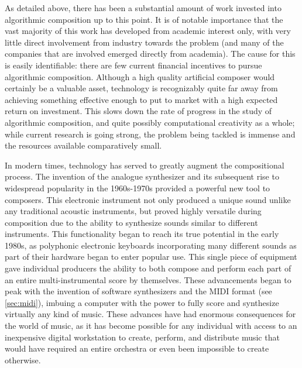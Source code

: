 \documentclass[ author={Stephen Livermore-Tozer},
				supervisor={Dr. Peter Flach},
				degree={MEng},
				title={Algorithmic Co-composition Using Machine Learning},
				subtitle={},
				type={research},
				year={2016} ]{dissertation}
\begin{document}
	As detailed above, there has been a substantial amount of work invested into algorithmic composition up to this point. It is of notable importance that the vast majority of this work has developed from academic interest only, with very little direct involvement from industry towards the problem (and many of the companies that are involved emerged directly from academia). The cause for this is easily identifiable: there are few current financial incentives to pursue algorithmic composition. Although a high quality artificial composer would certainly be a valuable asset, technology is recognizably quite far away from achieving something effective enough to put to market with a high expected return on investment. This slows down the rate of progress in the study of algorithmic composition, and quite possibly computational creativity as a whole; while current research is going strong, the problem being tackled is immense and the resources available comparatively small. 
%	
	
	
	In modern times, technology has served to greatly augment the compositional process. The invention of the 
	analogue synthesizer and its subsequent rise to widespread popularity in the 1960s-1970s provided a powerful new tool to composers. This electronic instrument not only produced a unique sound unlike any traditional acoustic instruments, but proved highly versatile during composition due to the ability to synthesize sounds similar to different instruments. This functionality began to reach its true potential in the early 1980s, as polyphonic electronic keyboards incorporating many different sounds as part of their hardware began to enter popular use. This single piece of equipment gave individual producers the ability to both compose and perform each part of an entire multi-instrumental score by themselves. These advancements began to peak with the invention of software synthesizers and the MIDI format (see \ref{sec:midi}), imbuing a computer with the power to fully score and synthesize virtually any kind of music. These advances have had enormous consequences for the world of music, as it has become possible for any individual with access to an inexpensive digital workstation to create, perform, and distribute music that would have required an entire orchestra or even been impossible to create otherwise.
	
\end{document}
